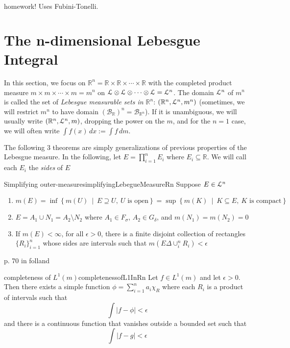 \documentclass[oneside]{book}
\newcommand{\R}{\mathbb{R}}
\newcommand{\EL}{\EuScript{L}}
\newcommand{\BB}{\mathcal{B}}
\newcommand{\sse}{\subseteq}
\newcommand{\set}[2]{\left\{#1 \ \middle|\ #2\right\}}
\begin{document}
\begin{Proof}
	homework! Uses Fubini-Tonelli.
\end{Proof}

\section{The n-dimensional Lebesgue Integral}

In this section, we focus on $\R^n = \R\times \R\times \cdots \times \R$ with the completed product measure $m\times
m\times \cdots \times m = m^n$ on $\EL\otimes \EL\otimes \cdots\otimes \EL = \EL^n$. The domain $\EL^n$ of $m^n$ is
called the set of \emph{Lebesgue measurable sets in $\R^n$}: $(\R^n, \EL^n, m^n)$ (sometimes, we will restrict $m^n$ to have domain
$(\BB_\R)^n = \BB_{\R^n}$). If it is unambiguous, we will usually write $(\R^n, \EL^n, m)$, dropping the power on the
$m$, and for the $n = 1$ case, we will often write $\int f(x)\,dx := \int f\,dm$. 

The following 3 theorems are simply generalizations of previous properties of the Lebesgue measure. In the following, let $E
= \prod_{i=1}^n E_i$ where $E_i \sse \R$. We will call each $E_i$ the \emph{sides} of $E$

\begin{thm}{Simplifying outer-measure}{simplifyingLebegueMeasureRn}
	Suppose $E \in \EL^n$
	\begin{enumerate}
		\item $m(E) = \inf\set{m(U)}{E \supseteq U,\ \text{$U$ is open}} = \sup\set{m(K)}{K \sse E,\ \text{$K$ is compact}}$
		\item $E = A_1\cup N_1 = A_2\setminus N_2$ where $A_1 \in F_\sigma$, $A_2 \in G_\delta$, and $m(N_1) = m(N_2)
			= 0$
		\item If $m(E) < \infty$, for all $\epsilon > 0$, there is a finite disjoint collection of rectangles
			$\{R_i\}_{i=1}^n$ whose sides are intervals such that $m(E\Delta \cup_i^n R_i) < \epsilon$
	\end{enumerate}
\end{thm}

\begin{Proof}
	p. 70 in folland
\end{Proof}

\begin{thm}{completeness of $L^1(m)$}{completenessofL1InRn}
	Let $f \in L^1(m)$ and let $\epsilon > 0$. Then there exists a simple function $\phi = \sum_{i=1}^n a_i\chi_R$ where
	each $R_i$ is a product of intervals such that 
	\[
		\int |f-\phi| < \epsilon
	\]
	and there is a continuous function that vanishes outside a bounded set such that 
	\[
		\int |f-g| < \epsilon
	\]
\end{thm}
\end{document}
